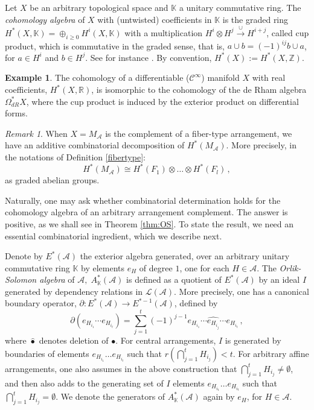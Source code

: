 \documentclass[psamsfonts]{conm-p-l}
\theoremstyle{definition}
\newtheorem{example}[theorem]{Example}
\theoremstyle{remark}
\newtheorem{remark}[theorem]{Remark}
\numberwithin{equation}{section}
\newcommand{\A}{{\mathcal A}}
\newcommand{\Z}{\mathbb{Z}}
\newcommand{\R}{\mathbb{R}}
\newcommand{\K}{\mathbb{K}}
\begin{document}
Let $X$ be an arbitrary topological space and $\K$ a unitary commutative ring. 
The  {\em cohomology algebra} of $X$ with (untwisted) coefficients in $\K$ is 
the graded ring 
$H^*(X, \K)=\oplus_{i \geq 0}H^i(X, \K)$ with a multiplication 
$H^i \otimes H^j \overset{\cup} \rightarrow H^{i+j}$, called cup product,
which is commutative in the graded sense, that is, $a \cup b= (-1)^{ij} b\cup a$,
for $a\in H^i$ and $b\in H^j$. See for instance \cite{H}.
By convention, $H^*(X):=H^*(X,\Z)$.

\begin{example}
\label{deRham}
The cohomology of a differentiable ($\mathcal{C}^{\infty}$) manifold $X$ with real coefficients, 
$H^*(X,\R)$, is isomorphic to the cohomology of the de Rham algebra $\Omega^*_{dR}X$, where 
the cup product is induced by the exterior product on differential forms.
\end{example}

\begin{remark}
\label{lineardecomp}
When $X=M_{\A}$ is the complement of a fiber-type arrangement, we have an additive combinatorial 
decomposition of $H^*(M_{\A})$. More precisely, in the notations of Definition \ref{fibertype}:
%
\begin{equation}
\label{factor}
H^*(M_{\A}) \cong H^*(F_1) \otimes \dots \otimes H^*(F_l)\, ,
\end{equation}
as graded abelian groups.
\end{remark}

Naturally, one may ask whether combinatorial determination holds for the cohomology algebra of 
an arbitrary arrangement complement. The answer is positive, as we shall see in Theorem \ref{thm:OS}. 
To state the result, we need an essential combinatorial ingredient, which we describe next.

Denote by $E^*(\A)$ the exterior algebra generated, over an arbitrary unitary commutative ring 
$\mathbb{K}$ by elements $e_H$ of degree $1$, one for each $H \in \A$. The 
{\it Orlik-Solomon algebra} of $\A,\; A_{\mathbb{K}}^*(\A)$ is defined as a quotient of 
 $E^*(\A)$ by an ideal $I$ generated by dependency relations in $\mathcal L(\A)$. More precisely,
 one has a canonical boundary operator, $\partial \colon E^*(\A)\to E^{*-1}(\A)$, defined by
 \begin{equation}
 \label{eq:32}
 \partial (e_{H_{i_1}}\cdots e_{H_{i_t}})= \sum_{j=1}^t (-1)^{j-1} e_{H_{i_1}}\cdots 
 \widehat{e_{H_{i_j}}} \cdots e_{H_{i_t}}\, ,
 \end{equation}
 where $\widehat{\bullet}$ denotes deletion of $\bullet$.
 For central arrangements, $I$ is generated by boundaries of elements $e_{H_{i_1}} \dots e_{H_{i_t}}$ 
 such that $r(\bigcap_{j=1}^{t}H_{i_{j}}) <t$. For arbitrary affine arrangements, one
 also assumes in the above construction that $\bigcap_{j=1}^{t}H_{i_{j}}\ne \emptyset$, and then
 also adds to the generating set of $I$ elements $e_{H_{i_1}} \dots e_{H_{i_t}}$ such that 
 $ \bigcap_{j=1}^{t}H_{i_{j}}= \emptyset$. We denote the generators of $A_{\mathbb{K}}^*(\A)$ 
 again by $e_{H}$, for  $H \in \A$.
 
\end{document}
